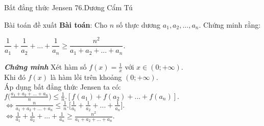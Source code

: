\begin{frame}{{Bất đẳng thức Jensen} \hspace{6.5cm} 76.Dương Cẩm Tú} 

\begin{block}{Bài toán đề xuất} 
\textbf{Bài toán}: Cho $n$ số thực dương $a_1,a_2,...,a_n$. Chứng minh rằng:\\
\begin{center}
 $\displaystyle\dfrac{1}{a_1}+\dfrac{1}{a_2}+...+\dfrac{1}{a_n}\geq \dfrac{n^2}{a_1+a_2+...+a_n}.$\\   
\end{center}
\end{block} 
\textbf{\textit{Chứng minh}}
Xét hàm số $f(x)=\frac{1}{x}$ với $x\in (0;+\infty)$.\\
\pause 
Khi đó $f(x)$ là hàm lồi trên khoảng $(0;+\infty)$.\\
\pause 
Áp dụng bất đẳng thức Jensen ta có:\\
\pause 
\vspace{0,15cm}
$f\Big( \displaystyle\frac{a_1+a_2+...+a_n}{n}\Big) \leq \frac{1}{n}.[f(a_1)+f(a_2)+...+f(a_n)].$\\
\pause 
\vspace{0,15cm}
$\Leftrightarrow \displaystyle\frac{n}{a_1+a_2+...+a_n}\leq \frac{1}{n}.\Big[ \frac{1}{a_1}+\frac{1}{a_2}+...+\frac{1}{a_n}\Big].$\\
\pause 
\vspace{0,15cm}
$\Leftrightarrow \displaystyle\frac{1}{a_1}+\frac{1}{a_2}+...+\displaystyle\frac{1}{a_n}\geq \frac{n^2}{a_1+a_2+...+a_n}.$
\end{frame}

